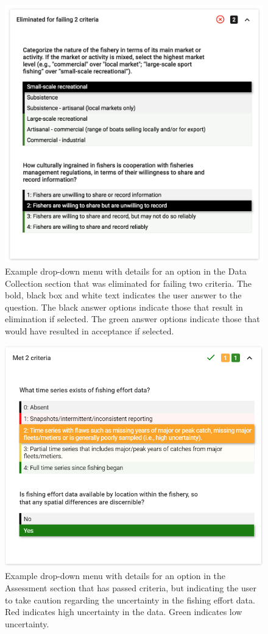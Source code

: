 \documentclass[
  11pt,
]{book}
\begin{document}
\begin{figure}

{\centering \includegraphics[width=0.75\linewidth]{images/crit-drop-down} 

}

\caption{Example drop-down menu with details for an option in the Data Collection section that was eliminated for failing two criteria. The bold, black box and white text indicates the user answer to the question. The black answer options indicate those that result in elimination if selected. The green answer options indicate those that would have resulted in acceptance if selected.}\label{fig:crit-drop-down}
\end{figure}

\begin{figure}

{\centering \includegraphics[width=0.75\linewidth]{images/assessment-crit-drop-down} 

}

\caption{Example drop-down menu with details for an option in the Assessment section that has passed criteria, but indicating the user to take caution regarding the uncertainty in the fishing effort data. Red indicates high uncertainty in the data. Green indicates low uncertainty.}\label{fig:assessment-crit-drop-down}
\end{figure}
\end{document}
